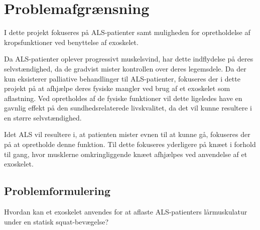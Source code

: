\section{Problemafgrænsning}
I dette projekt fokuseres på ALS-patienter samt muligheden for opretholdelse af kropsfunktioner ved benyttelse af exoskelet. 

Da ALS-patienter oplever progressivt muskelsvind, har dette indflydelse på deres selvstændighed, da de gradvist mister kontrollen over deres legemsdele. Da der kun eksisterer palliative behandlinger til ALS-patienter, fokuseres der i dette projekt på at afhjælpe deres fysiske mangler ved brug af et exoskelet som aflastning.
Ved opretholdes af de fysiske funktioner vil dette ligeledes have en gavnlig effekt på den sundhedsrelaterede livskvalitet, da det vil kunne resultere i en større selvstændighed.%

Idet ALS vil resultere i, at patienten mister evnen til at kunne gå, fokuseres der på at opretholde denne funktion. Til dette fokuseres yderligere på knæet i forhold til gang, hvor musklerne omkringliggende knæet afhjælpes ved anvendelse af et exoskelet.

\subsection{Problemformulering}
Hvordan kan et exoskelet anvendes for at aflaste ALS-patienters lårmuskulatur under en statisk squat-bevægelse?